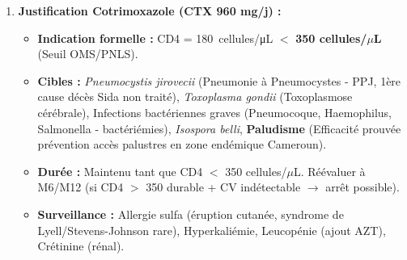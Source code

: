 \documentclass[11pt]{article}
\begin{document}
\begin{exoresolu}
\begin{enumerate}
\begin{itemize}
    \end{itemize}
    \item \textbf{Justification Cotrimoxazole (CTX 960 mg/j) :}
    \begin{itemize}
        \item \textbf{Indication formelle :} CD4 = \SI{180}{cellules/\micro\liter} $<$ \textbf{350 cellules/$\mu$L} (Seuil OMS/PNLS).
        \item \textbf{Cibles :} \emph{Pneumocystis jirovecii} (Pneumonie à Pneumocystes - PPJ, 1ère cause décès Sida non traité), \emph{Toxoplasma gondii} (Toxoplasmose cérébrale), Infections bactériennes graves (Pneumocoque, Haemophilus, Salmonella - bactériémies), \emph{Isospora belli}, \textbf{Paludisme} (Efficacité prouvée prévention accès palustres en zone endémique Cameroun).
        \item \textbf{Durée :} Maintenu tant que CD4 $<$ 350 cellules/$\mu$L. Réévaluer à M6/M12 (si CD4 $>$ 350 durable + CV indétectable $\rightarrow$ arrêt possible).
        \item \textbf{Surveillance :} Allergie sulfa (éruption cutanée, syndrome de Lyell/Stevens-Johnson rare), Hyperkaliémie, Leucopénie (ajout AZT), Crétinine (rénal).
    \end{itemize}
\end{enumerate}


\end{exoresolu}
\end{document}
